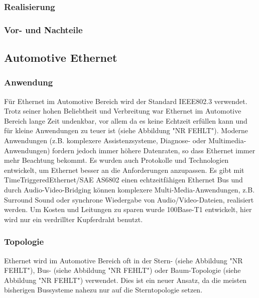 \subsubsection{Realisierung}
\subsubsection{Vor- und Nachteile}

\subsection{Automotive Ethernet}
\subsubsection{Anwendung}
Für Ethernet im Automotive Bereich wird der Standard IEEE802.3 verwendet. Trotz seiner hohen Beliebtheit und Verbreitung war Ethernet im Automotive Bereich lange Zeit undenkbar, vor allem da es keine Echtzeit erfüllen kann und für kleine Anwendungen zu teuer ist (siehe Abbildung "NR FEHLT"). Moderne Anwendungen (z.B. komplexere Assistenzsysteme, Diagnose- oder Multimedia-Anwendungen) fordern jedoch immer höhere Datenraten, so dass Ethernet immer mehr Beachtung bekommt. Es wurden auch Protokolle und Technologien entwickelt, um Ethernet besser an die Anforderungen anzupassen. Es gibt mit TimeTriggeredEthernet/SAE AS6802 einen echtzeitfähigen Ethernet Bus und durch Audio-Video-Bridging können komplexere Multi-Media-Anwendungen, z.B. Surround Sound oder synchrone Wiedergabe von Audio/Video-Dateien, realisiert werden. Um Kosten und Leitungen zu sparen wurde 100Base-T1 entwickelt, hier wird nur ein verdrillter Kupferdraht benutzt.

\cite{.MH_Ethernet}
\cite{.MH_AutoEthernet}

\subsubsection{Topologie}
Ethernet wird im Automotive Bereich oft in der Stern- (siehe Abbildung "NR FEHLT"), Bus- (siehe Abbildung "NR FEHLT") oder Baum-Topologie (siehe Abbildung "NR FEHLT") verwendet. Dies ist ein neuer Ansatz, da die meisten bisherigen Bussysteme nahezu nur auf die Sterntopologie setzen.

\cite{.MH_Vehicle}

